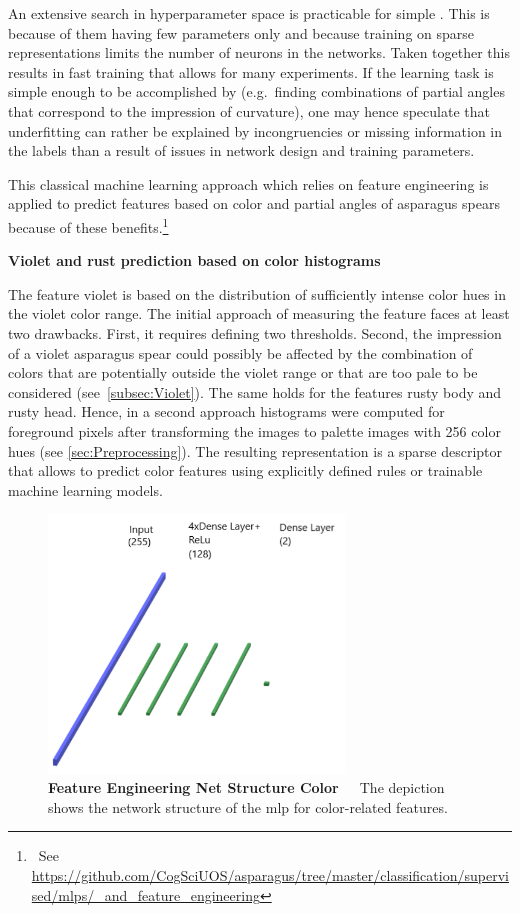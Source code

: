 An extensive search in hyperparameter space is practicable for simple . This is because of them having few parameters only and because training on sparse representations limits the number of neurons in the networks. Taken together this results in fast training that allows for many experiments. If the learning task is simple enough to be accomplished by  (e.g.\ finding combinations of partial angles that correspond to the impression of curvature), one may hence speculate that underfitting can rather be explained by incongruencies or missing information in the labels than a result of issues in network design and training parameters. 

This classical machine learning approach which relies on feature engineering is applied to predict features based on color and partial angles of asparagus spears because of these benefits.\footnote{~See \url{https://github.com/CogSciUOS/asparagus/tree/master/classification/supervised/mlps/\_and\_feature\_engineering}}

\bigskip
\textbf{Violet and rust prediction based on color histograms} 

The feature violet is based on the distribution of sufficiently intense color hues in the violet color range. The initial approach of measuring the feature faces at least two drawbacks. First, it requires defining two thresholds. Second, the impression of a violet asparagus spear could possibly be affected by the combination of colors that are potentially outside the violet range or that are too pale to be considered (see~\autoref{subsec:Violet}). The same holds for the features rusty body and rusty head. Hence, in a second approach histograms were computed for foreground pixels after transforming the images to palette images with 256 color hues (see \autoref{sec:Preprocessing}). The resulting representation is a sparse descriptor that allows to predict color features using explicitly defined rules or trainable machine learning models.

\begin{figure}[!htb]
	\centering
	\includegraphics[width=0.70\textwidth]{Figures/chapter04/fe_color.png}
	\decoRule
	\caption[Feature Engineering Net Structure Color]{\textbf{Feature Engineering Net Structure Color}~~~The depiction shows the network structure of the \acrshort{mlp} for color-related features.}
	\label{fig:FeatureEngineeringNetStructureColor}
\end{figure}

